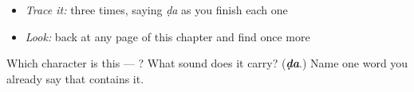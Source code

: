\begin{quote}
\end{quote}

\begin{itemize}
\raggedright
  \item \emph{Trace it:}  three times, saying \emph{ḍa} as you finish each one
  \item \emph{Look:} back at any page of this chapter and find  once more
\end{itemize}

\begin{tcolorbox}[breakable,colback=teal!4,colframe=teal!35!black,title={Before you move on}]
Which character is this — ? What sound does it carry? (\emph{\textbf{ḍa}}.) Name one word you already say that contains it.
\end{tcolorbox}
